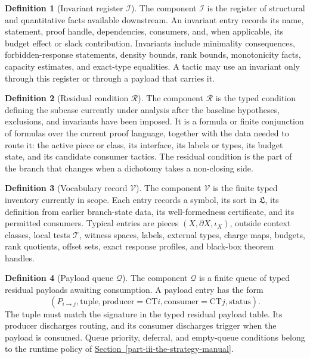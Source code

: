 \documentclass[
  11pt,
]{article}
\theoremstyle{definition}
\newtheorem{definition}{Definition}[section]
\newcommand{\secref}[1]{\hyperref[#1]{Section~\ref*{#1}}}
\begin{document}
\begin{definition}[Invariant register \(\mathcal I\)]\label{def:invariant-register}
The component \(\mathcal I\) is the register of structural and
quantitative facts available downstream.  An invariant entry records its
name, statement, proof handle, dependencies, consumers, and, when
applicable, its budget effect or slack contribution.  Invariants include
minimality consequences, forbidden-response statements, density bounds,
rank bounds, monotonicity facts, capacity estimates, and exact-type
equalities.  A tactic may use an invariant only through this register or
through a payload that carries it.
\end{definition}

\begin{definition}[Residual condition \(\mathcal R\)]\label{def:residual-condition}
The component \(\mathcal R\) is the typed condition defining the subcase
currently under analysis after the baseline hypotheses, exclusions, and
invariants have been imposed.  It is a formula or finite conjunction of
formulas over the current proof language, together with the data needed
to route it: the active piece or class, its interface, its labels or
types, its budget state, and its candidate consumer tactics.  The
residual condition is the part of the branch that changes when a
dichotomy takes a non-closing side.
\end{definition}

\begin{definition}[Vocabulary record \(\mathcal V\)]\label{def:vocabulary-record}
The component \(\mathcal V\) is the finite typed inventory currently in
scope.  Each entry records a symbol, its sort in \(\mathfrak L\), its
definition from earlier branch-state data, its well-formedness
certificate, and its permitted consumers.  Typical entries are pieces
\((X,\partial X,\iota_X)\), outside context classes, local tests
\(\mathcal T\), witness spaces, labels, external types, charge maps,
budgets, rank quotients, offset sets, exact response profiles, and
black-box theorem handles.
\end{definition}

\begin{definition}[Payload queue \(\mathcal Q\)]\label{def:payload-queue}
The component \(\mathcal Q\) is a finite queue of typed residual payloads
awaiting consumption.  A payload entry has the form
\[
(P_{i\to j},\mathrm{tuple},\mathrm{producer}=\mathrm{CT}i,
  \mathrm{consumer}=\mathrm{CT}j,\mathrm{status}).
\]
The tuple must match the signature in the typed residual payload table.
Its producer discharges routing, and its consumer discharges trigger when
the payload is consumed.  Queue priority, deferral, and empty-queue
conditions belong to the runtime policy of
\secref{part-iii-the-strategy-manual}.
\end{definition}
\end{document}
